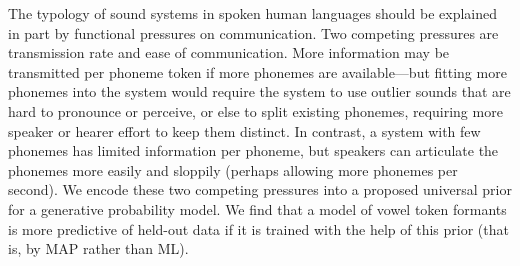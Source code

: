 The typology of sound systems in spoken human languages should be explained in part by functional pressures on communication.  Two competing pressures are transmission rate and ease of communication.  More information may be transmitted per phoneme token if more phonemes are available---but fitting more phonemes into the system would require the system to use outlier sounds that are hard to pronounce or perceive, or else to split existing phonemes, requiring more speaker or hearer effort to keep them distinct.  In contrast, a system with few phonemes has limited information per phoneme, but speakers can articulate the phonemes more easily and sloppily (perhaps allowing more phonemes per second). We encode these two competing pressures into a proposed universal prior for a generative probability model. We find that a model of vowel token formants is more predictive of held-out data if it is trained with the help of this prior (that is, by MAP rather than ML).